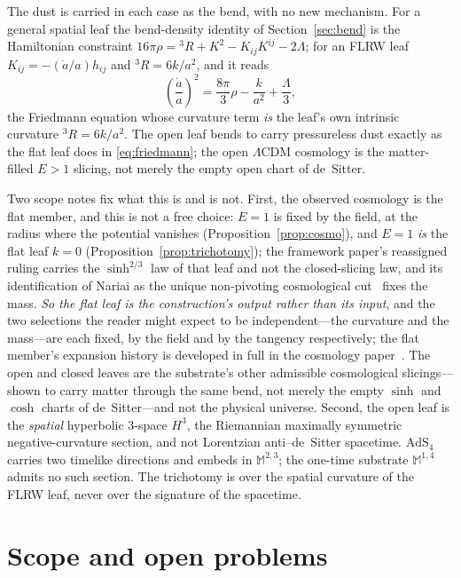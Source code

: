 \documentclass[11pt,a4paper]{article}
\theoremstyle{definition}
\begin{document}
The dust is carried in each case as the bend, with no new mechanism. For a general spatial leaf the bend-density identity of Section~\ref{sec:bend} is the Hamiltonian constraint $16\pi\rho={}^{3}R+K^{2}-K_{ij}K^{ij}-2\Lambda$; for an FLRW leaf $K_{ij}=-(\dot a/a)h_{ij}$ and ${}^{3}R=6k/a^{2}$, and it reads
\begin{equation}\label{eq:friedmann-k}
\left(\frac{\dot a}{a}\right)^{2}=\frac{8\pi}{3}\rho-\frac{k}{a^{2}}+\frac{\Lambda}{3},
\end{equation}
the Friedmann equation whose curvature term \emph{is} the leaf's own intrinsic curvature ${}^{3}R=6k/a^{2}$. The open leaf bends to carry pressureless dust exactly as the flat leaf does in \eqref{eq:friedmann}; the open $\Lambda$CDM cosmology is the matter-filled $E>1$ slicing, not merely the empty open chart of de~Sitter.

Two scope notes fix what this is and is not. First, the observed cosmology is the flat member, and this is not a free choice: $E=1$ is fixed by the field, at the radius where the potential vanishes (Proposition~\ref{prop:cosmo}), and $E=1$ \emph{is} the flat leaf $k=0$ (Proposition~\ref{prop:trichotomy}); the framework paper's reassigned ruling carries the $\sinh^{2/3}$ law of that leaf and not the closed-slicing law, and its identification of Nariai as the unique non-pivoting cosmological cut~\cite{JanzenCRframework} fixes the mass. \emph{So the flat leaf is the construction's output rather than its input}, and the two selections the reader might expect to be independent---the curvature and the mass---are each fixed, by the field and by the tangency respectively; the flat member's expansion history is developed in full in the cosmology paper~\cite{JanzenCRcosmology}. The open and closed leaves are the substrate's other admissible cosmological slicings---shown to carry matter through the same bend, not merely the empty $\sinh$ and $\cosh$ charts of de~Sitter---and not the physical universe. Second, the open leaf is the \emph{spatial} hyperbolic $3$-space $H^{3}$, the Riemannian maximally symmetric negative-curvature section, and not Lorentzian anti--de~Sitter spacetime. $\mathrm{AdS}_{4}$ carries two timelike directions and embeds in $\mathbb{M}^{2,3}$; the one-time substrate $\mathbb{M}^{1,4}$ admits no such section. The trichotomy is over the spatial curvature of the FLRW leaf, never over the signature of the spacetime.

\section{Scope and open problems}\label{sec:open}
\end{document}

